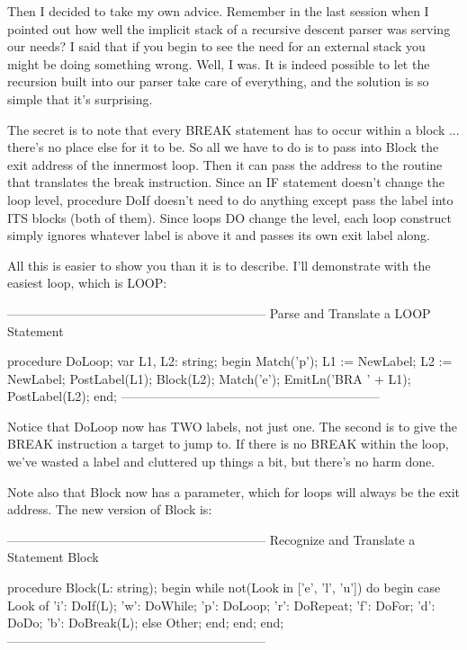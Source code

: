 \documentclass[float=false, crop=false]{standalone}
\begin{document}
Then I decided to take my own advice. Remember in the last session when I
pointed out how well the implicit stack of a recursive descent parser was
serving our needs? I said that if you begin to see the need for an external
stack you might be doing something wrong. Well, I was. It is indeed possible to
let the recursion built into our parser take care of everything, and the
solution is so simple that it's surprising.

The secret is to note that every BREAK statement has to occur within a block ...
there's no place else for it to be. So all we have to do is to pass into Block
the exit address of the innermost loop. Then it can pass the address to the
routine that translates the break instruction. Since an IF statement doesn't
change the loop level, procedure DoIf doesn't need to do anything except pass
the label into ITS blocks (both of them). Since loops DO change the level, each
loop construct simply ignores whatever label is above it and passes its own exit
label along.

All this is easier to show you than it is to describe. I'll demonstrate with the
easiest loop, which is LOOP:

\begin{code}
{--------------------------------------------------------------}
{ Parse and Translate a LOOP Statement }

procedure DoLoop;
var L1, L2: string;
begin
   Match('p');
   L1 := NewLabel;
   L2 := NewLabel;
   PostLabel(L1);
   Block(L2);
   Match('e');
   EmitLn('BRA ' + L1);
   PostLabel(L2);
end;
{--------------------------------------------------------------}
\end{code}

Notice that DoLoop now has TWO labels, not just one. The second is to give the
BREAK instruction a target to jump to. If there is no BREAK within the loop,
we've wasted a label and cluttered up things a bit, but there's no harm done.

Note also that Block now has a parameter, which for loops will always be the
exit address. The new version of Block is:

\begin{code}
{--------------------------------------------------------------}
{ Recognize and Translate a Statement Block }

procedure Block(L: string);
begin
   while not(Look in ['e', 'l', 'u']) do begin
      case Look of
       'i': DoIf(L);
       'w': DoWhile;
       'p': DoLoop;
       'r': DoRepeat;
       'f': DoFor;
       'd': DoDo;
       'b': DoBreak(L);
       else Other;
      end;
   end;
end;
{--------------------------------------------------------------}
\end{code}
\end{document}
